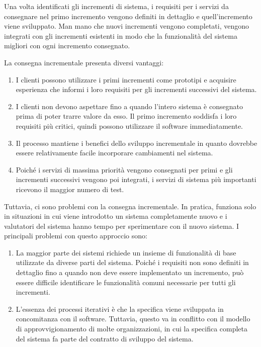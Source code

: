 Una volta identificati gli incrementi di sistema, i requisiti per i servizi da consegnare nel primo incremento vengono definiti in dettaglio e quell'incremento viene sviluppato. Man mano che nuovi incrementi vengono completati, vengono integrati con gli incrementi esistenti in modo che la funzionalità del sistema migliori con ogni incremento consegnato.

La consegna incrementale presenta diversi vantaggi:
\begin{enumerate}
    \item I clienti possono utilizzare i primi incrementi come prototipi e acquisire esperienza che informi i loro requisiti per gli incrementi successivi del sistema.
    \item I clienti non devono aspettare fino a quando l'intero sistema è consegnato prima di poter trarre valore da esso. Il primo incremento soddisfa i loro requisiti più critici, quindi possono utilizzare il software immediatamente.
    \item Il processo mantiene i benefici dello sviluppo incrementale in quanto dovrebbe essere relativamente facile incorporare cambiamenti nel sistema.
    \item Poiché i servizi di massima priorità vengono consegnati per primi e gli incrementi successivi vengono poi integrati, i servizi di sistema più importanti ricevono il maggior numero di test.
\end{enumerate}
Tuttavia, ci sono problemi con la consegna incrementale. In pratica, funziona solo in situazioni in cui viene introdotto un sistema completamente nuovo e i valutatori del sistema hanno tempo per sperimentare con il nuovo sistema. I principali problemi con questo approccio sono:
\begin{enumerate}
    \item La maggior parte dei sistemi richiede un insieme di funzionalità di base utilizzate da diverse parti del sistema. Poiché i requisiti non sono definiti in dettaglio fino a quando non deve essere implementato un incremento, può essere difficile identificare le funzionalità comuni necessarie per tutti gli incrementi.
    \item L'essenza dei processi iterativi è che la specifica viene sviluppata in concomitanza con il software. Tuttavia, questo va in conflitto con il modello di approvvigionamento di molte organizzazioni, in cui la specifica completa del sistema fa parte del contratto di sviluppo del sistema.
\end{enumerate}

